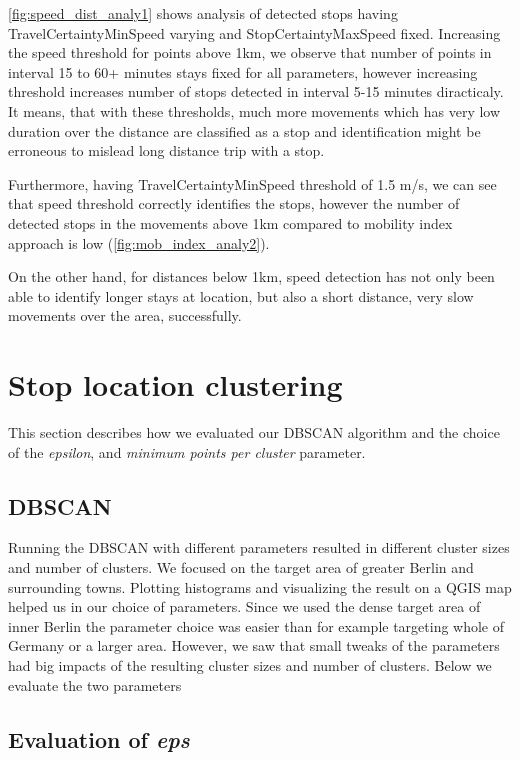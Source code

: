 \autoref{fig:speed_dist_analy1} shows analysis of detected stops having TravelCertaintyMinSpeed varying and StopCertaintyMaxSpeed fixed. Increasing the speed threshold for points above 1km, we observe that number of points in interval 15 to 60+ minutes stays fixed for all parameters, however increasing threshold increases number of stops detected in interval 5-15 minutes diracticaly. It means, that with these thresholds, much more movements which has very low duration over the distance are classified as a stop and identification might be erroneous to mislead long distance trip with a stop. 

Furthermore, having TravelCertaintyMinSpeed threshold of 1.5 m/s, we can see that speed threshold correctly identifies the stops, however the number of detected stops in the movements above 1km compared to mobility index approach is low (\autoref{fig:mob_index_analy2}).

On the other hand, for distances below 1km, speed detection has not only been able to identify longer stays at location, but also a short distance, very slow movements over the area, successfully. 

\section{Stop location clustering}

This section describes how we evaluated our DBSCAN algorithm and the choice of the \textit{epsilon}, and \textit{minimum points per cluster} parameter.

\subsection{DBSCAN}

 Running the DBSCAN with different parameters resulted in different cluster sizes and number of clusters. We focused on the target area of greater Berlin and surrounding towns. Plotting histograms and visualizing the result on a QGIS \cite{qis}  map helped us in our choice of parameters. Since we used the dense target area of inner Berlin the parameter choice was easier than for example targeting whole of Germany or a larger area. However, we saw that small tweaks of the parameters had big impacts of the resulting cluster sizes and number of clusters. Below we evaluate the two parameters

\subsection{Evaluation of \textit{eps}}

